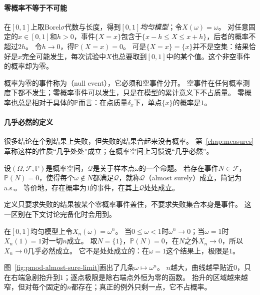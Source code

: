 \paragraph{零概率不等于不可能}
在$[0,1]$上取Borel$\sigma$代数与长度，得到\emph{$[0,1]$均匀模型}；令$X(\omega)=\omega$。
对任意固定的$x\in[0,1]$和$h>0$，事件$\{X=x\}$包含于$\{x-h\le X\le x+h\}$，后者的概率不超过$2h$。
令$h\to0$，得$\mathbb P(X=x)=0$。
可是$\{X=x\}=\{x\}$并不是空集：结果恰好是$x$完全可能发生，每次试验中$X$也总要取到$[0,1]$中的某个值。这个非空事件的概率却为零。

概率为零的事件称为（null event），它必须和空事件分开。
空事件在任何概率测度下都不发生；零概率事件可以发生，只是在模型的累计意义下不占质量。
零概率也总是相对于具体的$\mathbb P$而言：在点质量$\delta_x$下，单点$\{x\}$的概率是$1$。

\paragraph{几乎必然的定义}
很多结论在个别结果上失败，但失败的结果合起来没有概率。
第~\ref{chap:measures}章称这样的性质“几乎处处”成立；在概率空间上习惯说“几乎必然”。

\begin{definition}[几乎必然]
\label{def:pmod-almost-sure}
设$(\Omega,\mathcal F,\mathbb P)$是概率空间，$\mathcal Q$是关于样本点$\omega$的一个命题。
若存在事件$N\in\mathcal F$，$\mathbb P(N)=0$，使得每个$\omega\notin N$都满足$\mathcal Q$，就称$\mathcal Q$（almost surely）成立，简记为a.s.。
等价地，存在概率为$1$的事件，在其上$\mathcal Q$处处成立。
\end{definition}

定义只要求失败的结果被某个零概率事件盖住，不要求失败集合本身是事件。
这一区别在下文讨论完备化时会用到。

\begin{example}[只在一点失败的极限]
\label{ex:pmod-power-limit}
在$[0,1]$均匀模型上令$X_n(\omega)=\omega^n$。
当$0\le\omega<1$时$\omega^n\to0$；当$\omega=1$时$X_n(1)=1$对一切$n$成立。
取$N=\{1\}$，$\mathbb P(N)=0$，在$N$之外$X_n\to0$，所以$X_n\to0$几乎必然成立。
它不是处处成立的：在$\omega=1$这个结果上，极限是$1$。
\end{example}

图~\ref{fig:pmod-almost-sure-limit}画出了几条$\omega\mapsto\omega^n$。
$n$越大，曲线越早贴近$0$，只在右端急剧抬升到$1$；逐点极限是除右端点外恒为零的函数。
抬升的区域越来越窄，但对每个固定的$n$都存在；真正的例外只剩一点，它不占概率。


